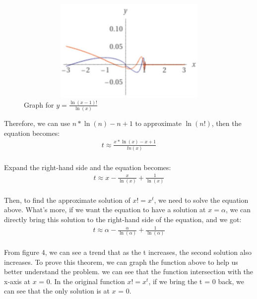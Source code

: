 \documentclass{article}
\begin{document}
        \begin{figure}[h]
        \centering
        \includegraphics[width=12cm, height = 5cm]{102.jpg}
        \caption{Graph for $y = \frac{\ln(x-1)!}{\ln(x)}$}
        \label{fig:picture}
        \end{figure}
        
        Therefore, we can use $n * \ln(n) - n + 1$ to approximate $\ln(n!)$, then the equation becomes:
            \begin{align*}
                t \approx \frac{x * \ln(x) - x + 1}{ln(x)}
            \end{align*}\\
        Expand the right-hand side and the equation becomes:
            \begin{align*}
                t \approx x - \frac{x}{\ln(x)} + \frac{1}{\ln(x)}
            \end{align*}\\

        Then, to find the approximate solution of $x! = x^{t}$, we need to solve the equation above. What's more, if we want the equation to have a solution at $x = \alpha$, we can directly bring this solution to the right-hand side of the equation, and we got:
            \begin{align*}
                t \approx \alpha - \frac{\alpha}{\ln(\alpha)} + \frac{1}{\ln(\alpha)}
            \end{align*}\\

        From figure 4, we can see a trend that as the t increases, the second solution also increases. To prove this theorem, we can graph the function above to help us better understand the problem. we can see that the function intersection with the x-axis at $x$ = 0. In the original function $x! = x^t$, if we bring the t = 0 back, we can see that the only solution is at $x$ = 0.\\

        
\end{document}
